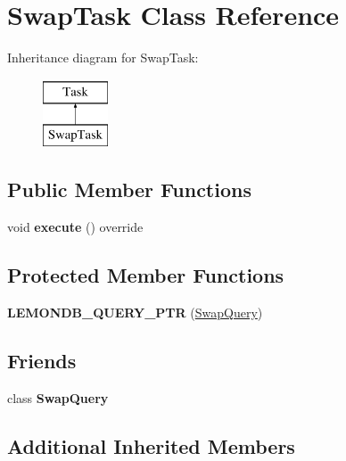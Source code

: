 \hypertarget{class_swap_task}{}\section{Swap\+Task Class Reference}
\label{class_swap_task}
Inheritance diagram for Swap\+Task\+:\begin{figure}[H]
\begin{center}
\leavevmode
\includegraphics[height=2.000000cm]{class_swap_task}
\end{center}
\end{figure}
\subsection*{Public Member Functions}
\begin{DoxyCompactItemize}
\item 
\mbox{\label{class_swap_task_a4316589196b4c497d759bcabbd891d27}} 
void {\bfseries execute} () override
\end{DoxyCompactItemize}
\subsection*{Protected Member Functions}
\begin{DoxyCompactItemize}
\item 
\mbox{\label{class_swap_task_a4e90c55667d739be6a175bde0f472727}} 
{\bfseries L\+E\+M\+O\+N\+D\+B\+\_\+\+Q\+U\+E\+R\+Y\+\_\+\+P\+TR} (\hyperlink{class_swap_query}{Swap\+Query})
\end{DoxyCompactItemize}
\subsection*{Friends}
\begin{DoxyCompactItemize}
\item 
\mbox{\label{class_swap_task_acc506341f1ba1e2a2c539110c8d1a525}} 
class {\bfseries Swap\+Query}
\end{DoxyCompactItemize}
\subsection*{Additional Inherited Members}


